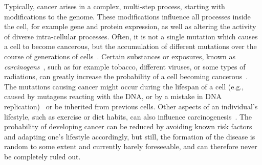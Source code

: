 Typically, cancer arises in a complex, multi-step process, starting with modifications to the genome.
These modifications influence all processes inside the cell, for example gene and protein expression, as well as altering the activity of diverse intra-cellular processes.
Often, it is not a single mutation which causes a cell to become cancerous, but the accumulation of different mutations over the course of generations of cells~\cite{stem_cell_mutations}.
Certain substances or exposures, known as \textit{carcinogens}~\cite{carcinogens-def}, such as for example tobacco, different viruses, or some types of radiations, can greatly increase the probability of a cell becoming cancerous~\cite{carcinogens}.
The mutations causing cancer might occur during the lifespan of a cell (e.g., caused by mutagens reacting with the DNA, or by a mistake in DNA replication)~\cite{mutations} or be inherited from previous cells.
Other aspects of an individual's lifestyle, such as exercise or diet habits, can also influence carcinogenesis~\cite{carcinogens,carcinogens-def}.
The probability of developing cancer can be reduced by avoiding known risk factors and adapting one's lifestyle accordingly, but still, the formation of the disease is random to some extent and currently barely foreseeable, and can therefore never be completely ruled out.

